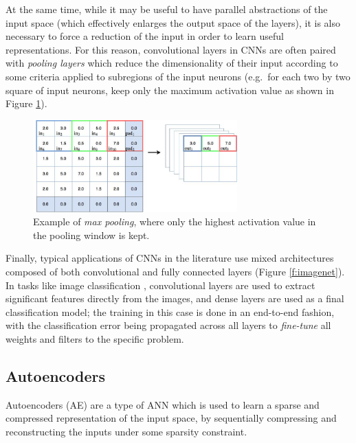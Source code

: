 At the same time, while it may be useful to have parallel abstractions of the 
input space (which effectively enlarges the output space of the layers), it is
also necessary to force a reduction of the input in order to learn useful 
representations. 
For this reason, convolutional layers in CNNs are often paired with 
\textit{pooling layers} which reduce the dimensionality of their input according
to some criteria applied to subregions of the input neurons (e.g.\ for each two 
by two square of input neurons, keep only the maximum activation value as 
shown in Figure \ref{f:max-pooling}).
%
\begin{figure}
    \includegraphics[width=0.7\textwidth]{pictures/max-pooling}
    \centering
    \caption[Max pooling]{Example of \textit{max pooling}, where only the 
	    highest activation value in the pooling window is kept.}
    \label{f:max-pooling}
\end{figure}
%

Finally, typical applications of CNNs in the literature use mixed 
architectures composed of both convolutional and fully connected layers (Figure 
\ref{f:imagenet}).
In tasks like image classification \cite{simonyan2014vggnet, szegedy2015going}, 
convolutional layers are used to extract significant features directly from the 
images, and dense layers are used as a final classification model; the training 
in this case is done in an end-to-end fashion, with the classification error 
being propagated across all layers to \textit{fine-tune} all weights and filters
to the specific problem.

\subsection{Autoencoders} \label{s:AE}
Autoencoders (AE) are a type of ANN which is used to learn a sparse and 
compressed representation of the input space, by sequentially compressing and 
reconstructing the inputs under some sparsity constraint.

